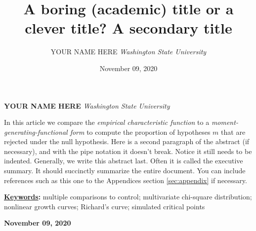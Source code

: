 \documentclass[]{article}
\title{\textbf{\textcolor{WSU.crimson}{A boring (academic) title or a clever title?}} \newline \textbf{\textcolor{WSU.gray}{A secondary title}}  }
\author{\Large YOUR NAME HERE\vspace{0.05in} \newline\normalsize\emph{Washington State University}  }
\date{November 09, 2020}
\newcommand*{\authorfont}{\fontfamily{phv}\selectfont}
\renewenvironment{abstract}
 {{%
    \setlength{\leftmargin}{0mm}
    \setlength{\rightmargin}{\leftmargin}%
  }%
  \relax}
 {\endlist}
\begin{document}
	
%

{%
\setlength{\parindent}{0pt}
\thispagestyle{plain}
{\fontsize{18}{20}\selectfont\raggedright 
\maketitle  %

}

{
   \vskip 13.5pt\relax \normalsize\fontsize{11}{12} 
   
\textbf{\authorfont YOUR NAME HERE} \hskip 15pt \emph{\small Washington State University}   

}

}








\begin{abstract}

    \hbox{\vrule height .2pt width 39.14pc}

    \vskip 8.5pt %

\noindent In this article we compare the \emph{empirical characteristic function}
\citep{Tukey:1977, Becker:1988} to a
\emph{moment-generating-functional form} to compute the proportion of
hypotheses \(m\) that are rejected under the null hypothesis.
\vspace{0.25in} \noindent Here is a second paragraph of the abstract (if
necessary), and with the pipe notation it doesn't break. Notice it still
needs to be indented. \vspace{0.25in} \noindent Generally, we write this
abstract last. Often it is called the executive summary. It should
succinctly summarize the entire document. You can include references
such as this one to the Appendices section \ref{sec:appendix} if
necessary.


\vskip 8.5pt \noindent \textbf{\underline{Keywords}:} multiple comparisons to control; multivariate chi-square distribution;
nonlinear growth curves; Richard's curve; simulated critical points \par

    




    
    \hbox{\vrule height .2pt width 39.14pc}
    \vskip 5pt 
    \hfill \textbf{\textcolor{WSU.gray}{ November 09, 2020 } }
    \vskip 5pt 
    
\end{abstract}
\end{document}
